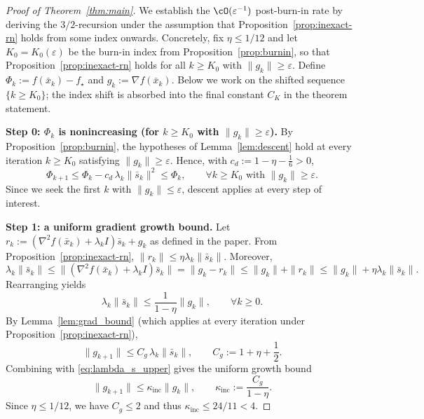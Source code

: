 \documentclass[review,onefignum,onetabnum]{siamart171218}
\begin{document}
\begin{proof}[Proof of Theorem~\ref{thm:main}]
We establish the $\cO(\varepsilon^{-1})$ post-burn-in rate
by deriving the $3/2$-recursion under the assumption that
Proposition~\ref{prop:inexact-rn} holds from some index onwards.
Concretely, fix $\eta\le 1/12$ and let $K_0=K_0(\varepsilon)$ be
the burn-in index from Proposition~\ref{prop:burnin}, so that
Proposition~\ref{prop:inexact-rn} holds for all $k\ge K_0$ with
$\|g_k\|\ge\varepsilon$.
Define $\Phi_k:=f(\bar x_k)-f_\star$ and $g_k:=\nabla f(\bar x_k)$.
Below we work on the shifted sequence $\{k\ge K_0\}$; the
index shift is absorbed into the final constant $C_K$ in the
theorem statement.

\smallskip
\noindent\textbf{Step 0: $\Phi_k$ is nonincreasing (for $k\ge K_0$ with $\|g_k\|\ge\varepsilon$).}
By Proposition~\ref{prop:burnin}, the hypotheses of Lemma~\ref{lem:descent} hold at every iteration $k\ge K_0$ satisfying $\|g_k\|\ge\varepsilon$.
Hence, with $c_d:=1-\eta-\frac16>0$,
\begin{equation}\label{eq:Phi_monotone}
\Phi_{k+1}\le \Phi_k - c_d\,\lambda_k\|\bar s_k\|^2\le \Phi_k,
\qquad \forall k\ge K_0 \text{ with } \|g_k\|\ge\varepsilon.
\end{equation}
Since we seek the first $k$ with $\|g_k\|\le\varepsilon$, descent applies at every step of interest.

\smallskip
\noindent\textbf{Step 1: a uniform gradient growth bound.}
Let $r_k:=(\nabla^2 f(\bar x_k)+\lambda_k I)\bar s_k+g_k$ as defined in the paper.
From Proposition~\ref{prop:inexact-rn}, $\|r_k\|\le \eta\lambda_k\|\bar s_k\|$.
Moreover,
\[
\lambda_k\|\bar s_k\|
\le \|(\nabla^2 f(\bar x_k)+\lambda_k I)\bar s_k\|
=\|g_k-r_k\|
\le \|g_k\|+\|r_k\|
\le \|g_k\|+\eta\lambda_k\|\bar s_k\|.
\]
Rearranging yields
\begin{equation}\label{eq:lambda_s_upper}
\lambda_k\|\bar s_k\|\le \frac{1}{1-\eta}\|g_k\|,\qquad \forall k\ge 0.
\end{equation}
By Lemma~\ref{lem:grad_bound} (which applies at every iteration under Proposition~\ref{prop:inexact-rn}),
\[
\|g_{k+1}\|\le C_g\,\lambda_k\|\bar s_k\|,
\qquad
C_g:=1+\eta+\frac12.
\]
Combining with \eqref{eq:lambda_s_upper} gives the uniform growth bound
\begin{equation}\label{eq:grad_growth}
\|g_{k+1}\|\le \kappa_{\mathrm{inc}}\|g_k\|,
\qquad
\kappa_{\mathrm{inc}}:=\frac{C_g}{1-\eta}.
\end{equation}
Since $\eta\le 1/12$, we have $C_g\le 2$ and thus $\kappa_{\mathrm{inc}}\le 24/11<4$.


\end{proof}
\end{document}
